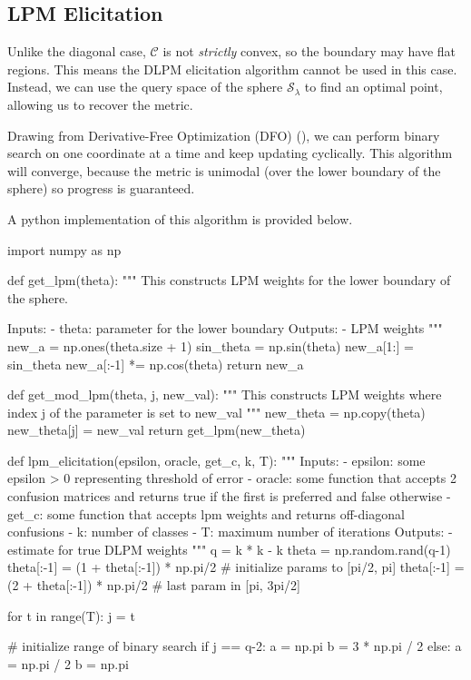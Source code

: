 \documentclass[
  letterpaper,
  DIV=11,
  numbers=noendperiod,
  oneside]{scrreprt}
\theoremstyle{remark}
\begin{document}
\subsection{LPM Elicitation}\label{lpm-elicitation}

Unlike the diagonal case, \(\mathcal{C}\) is not \emph{strictly} convex,
so the boundary may have flat regions. This means the DLPM elicitation
algorithm cannot be used in this case. Instead, we can use the query
space of the sphere \(\mathcal{S}_\lambda\) to find an optimal point,
allowing us to recover the metric.

Drawing from Derivative-Free Optimization (DFO)
(), we
can perform binary search on one coordinate at a time and keep updating
cyclically. This algorithm will converge, because the metric is unimodal
(over the lower boundary of the sphere) so progress is guaranteed.

A python implementation of this algorithm is provided below.

import numpy as np

def get\_lpm(theta): """ This constructs LPM weights for the lower
boundary of the sphere.

Inputs: - theta: parameter for the lower boundary Outputs: - LPM weights
""" new\_a = np.ones(theta.size + 1) sin\_theta = np.sin(theta)
new\_a{[}1:{]} = sin\_theta new\_a{[}:-1{]} *= np.cos(theta) return
new\_a

def get\_mod\_lpm(theta, j, new\_val): """ This constructs LPM weights
where index j of the parameter is set to new\_val """ new\_theta =
np.copy(theta) new\_theta{[}j{]} = new\_val return get\_lpm(new\_theta)

def lpm\_elicitation(epsilon, oracle, get\_c, k, T): """ Inputs: -
epsilon: some epsilon \textgreater{} 0 representing threshold of error -
oracle: some function that accepts 2 confusion matrices and returns true
if the first is preferred and false otherwise - get\_c: some function
that accepts lpm weights and returns off-diagonal confusions - k: number
of classes - T: maximum number of iterations Outputs: - estimate for
true DLPM weights """ q = k * k - k theta = np.random.rand(q-1)
theta{[}:-1{]} = (1 + theta{[}:-1{]}) * np.pi/2 \# initialize params to
{[}pi/2, pi{]} theta{[}:-1{]} = (2 + theta{[}:-1{]}) * np.pi/2 \# last
param in {[}pi, 3pi/2{]}

for t in range(T): j = t

\# initialize range of binary search if j == q-2: a = np.pi b = 3 *
np.pi / 2 else: a = np.pi / 2 b = np.pi
\end{document}
